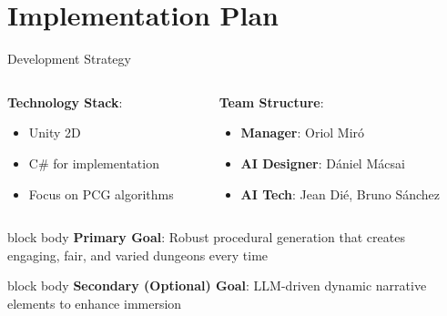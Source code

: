 \documentclass{beamer}
\begin{document}
\section{Implementation Plan}

\begin{frame}{Development Strategy}
    \begin{columns}[T]
        \begin{column}{0.48\textwidth}
            \textbf{Technology Stack}:
            \begin{itemize}
                \item \textcolor{ubburgundy}{Unity 2D}
                \item C\# for implementation
                \item Focus on PCG algorithms
            \end{itemize}
        \end{column}

        \begin{column}{0.48\textwidth}
            \textbf{Team Structure}:
            \begin{itemize}
                \item \textbf{Manager}: Oriol Miró
                \item \textbf{AI Designer}: Dániel Mácsai
                \item \textbf{AI Tech}: Jean Dié, Bruno Sánchez
            \end{itemize}
        \end{column}
    \end{columns}

    \vspace{0.4cm}
    \begin{beamercolorbox}[rounded=true,shadow=true,wd=\textwidth,center]{block body}
        \textbf{Primary Goal}: Robust procedural generation that creates\\
        engaging, fair, and varied dungeons every time
    \end{beamercolorbox}
    
    \vspace{0.25cm}
    \begin{beamercolorbox}[rounded=true,shadow=true,wd=\textwidth,center]{block body}
        \textbf{Secondary (Optional) Goal}: LLM-driven dynamic narrative\\ elements to enhance immersion
    \end{beamercolorbox}
\end{frame}
\end{document}
